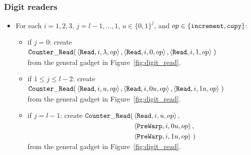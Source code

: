 \subsubsection{ Digit readers }

\begin{itemize}

\item For each $i = 1,2,3$,
               $j = l-1,\ldots,1$,
               $u \in \{0, 1\}^j$, and
               $op \in \{{\tt increment}, {\tt copy} \}$:
    \begin{itemize}
        \item if $j = 0$:
        create
        $\begin{aligned}[t]
            {\tt Counter\_Read}(& \left\langle {\tt Read}, i, \lambda, op \right\rangle,
                       \left\langle {\tt Read}, i, 0, op \right\rangle,
                       \left\langle {\tt Read}, i, 1, op \right\rangle \;)
        \end{aligned}$\\ from the general gadget in Figure~\ref{fig:digit_read}.

        \item if $1 \leqslant j \leqslant l -2$:
        create
        $\begin{aligned}[t]
        {\tt Counter\_Read}(& \left\langle {\tt Read}, i, u,  op \right\rangle,
                   \left\langle {\tt Read}, i, 0u, op \right\rangle,
                   \left\langle {\tt Read}, i, 1u, op \right\rangle \;)
        \end{aligned}$\\ from the general gadget in Figure~\ref{fig:digit_read}.

        \item if $j = l - 1$:
        create
        $\begin{aligned}[t]
            {\tt Counter\_Read}(& \left\langle {\tt Read}, i, u, op \right\rangle, \\
                     & \left\langle {\tt PreWarp},     i, 0u, op \right\rangle, \\
                     & \left\langle {\tt PreWarp},     i, 1u, op \right\rangle \;)
        \end{aligned}$\\from the general gadget in Figure~\ref{fig:digit_read}.

    \end{itemize}


\end{itemize}

